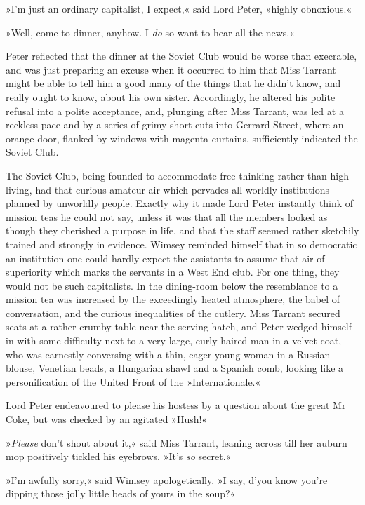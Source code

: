 »I'm just an ordinary capitalist, I expect,« said Lord Peter, »highly obnoxious.«

»Well, come to dinner, anyhow. I \textit{do} so want to hear all the news.«

Peter reflected that the dinner at the Soviet Club would be worse than execrable, and was just preparing an excuse when it occurred to him that Miss Tarrant might be able to tell him a good many of the things that he didn't know, and really ought to know, about his own sister.  Accordingly, he altered his polite refusal into a polite acceptance, and, plunging after Miss Tarrant, was led at a reckless pace and by a series of grimy short cuts into Gerrard Street, where an orange door, flanked by windows with magenta curtains, sufficiently indicated the Soviet Club.

The Soviet Club, being founded to accommodate free thinking rather than high living, had that curious amateur air which pervades all worldly institutions planned by unworldly people. Exactly why it made Lord Peter instantly think of mission teas he could not say, unless it was that all the members looked as though they cherished a purpose in life, and that the staff seemed rather sketchily trained and strongly in evidence. Wimsey reminded himself that in so democratic an institution one could hardly expect the assistants to assume that air of superiority which marks the servants in a West End club. For one thing, they would not be such capitalists. In the dining-room below the resemblance to a mission tea was increased by the exceedingly heated atmosphere, the babel of conversation, and the curious inequalities of the cutlery. Miss Tarrant secured seats at a rather crumby table near the serving-hatch, and Peter wedged himself in with some difficulty next to a very large, curly-haired man in a velvet coat, who was earnestly conversing with a thin, eager young woman in a Russian blouse, Venetian beads, a Hungarian shawl and a Spanish comb, looking like a personification of the United Front of the »Internationale.«

Lord Peter endeavoured to please his hostess by a question about the great Mr Coke, but was checked by an agitated »Hush!«

»\textit{Please} don't shout about it,« said Miss Tarrant, leaning across till her auburn mop positively tickled his eyebrows. »It's \textit{so} secret.«

»I'm awfully sorry,« said Wimsey apologetically. »I say, d'you know you're dipping those jolly little beads of yours in the soup?«

